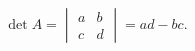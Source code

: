 \documentclass{article}
\begin{document}
\[
  \det A=
  \begin{vmatrix}a&b\\c&d\end{vmatrix}
  =ad-bc.
\]
\end{document}

